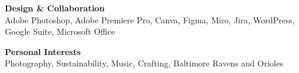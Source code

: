 \documentclass[a4paper,10pt]{article}
\begin{document}
\begin{multicols}{2}
\textbf{Design \& Collaboration} \\
Adobe Photoshop, Adobe Premiere Pro, Canva, Figma, Miro, Jira, WordPress, Google Suite, Microsoft Office

\columnbreak

\textbf{Personal Interests} \\
Photography, Sustainability, Music, Crafting, Baltimore Ravens and Orioles
\end{multicols}


\end{document}
